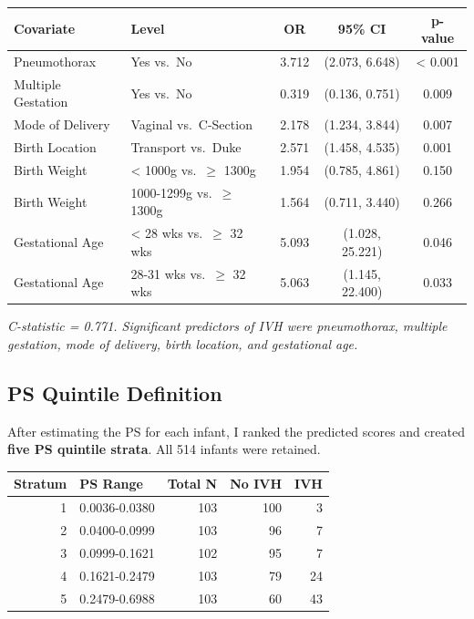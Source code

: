\documentclass[
]{article}
\begin{document}
\begin{longtable}[]{@{}llccc@{}}
\toprule
Covariate & Level & OR & 95\% CI & p-value \\
\midrule
\endhead
Pneumothorax & Yes vs.~No & 3.712 & (2.073, 6.648) & \textless{}
0.001 \\
Multiple Gestation & Yes vs.~No & 0.319 & (0.136, 0.751) & 0.009 \\
Mode of Delivery & Vaginal vs.~C-Section & 2.178 & (1.234, 3.844) &
0.007 \\
Birth Location & Transport vs.~Duke & 2.571 & (1.458, 4.535) & 0.001 \\
Birth Weight & \textless{} 1000g vs.~\(\geq\) 1300g & 1.954 & (0.785,
4.861) & 0.150 \\
Birth Weight & 1000-1299g vs.~\(\geq\) 1300g & 1.564 & (0.711, 3.440) &
0.266 \\
Gestational Age & \textless{} 28 wks vs.~\(\geq\) 32 wks & 5.093 &
(1.028, 25.221) & 0.046 \\
Gestational Age & 28-31 wks vs.~\(\geq\) 32 wks & 5.063 & (1.145,
22.400) & 0.033 \\
\bottomrule
\end{longtable}

\emph{C-statistic = 0.771. Significant predictors of IVH were
pneumothorax, multiple gestation, mode of delivery, birth location, and
gestational age.}

\hypertarget{ps-quintile-definition}{%
\subsection{PS Quintile Definition}\label{ps-quintile-definition}}

After estimating the PS for each infant, I ranked the predicted scores
and created \textbf{five PS quintile strata}. All 514 infants were
retained.

\begin{longtable}[]{@{}rlrrr@{}}
\toprule
Stratum & PS Range & Total N & No IVH & IVH \\
\midrule
\endhead
1 & 0.0036-0.0380 & 103 & 100 & 3 \\
2 & 0.0400-0.0999 & 103 & 96 & 7 \\
3 & 0.0999-0.1621 & 102 & 95 & 7 \\
4 & 0.1621-0.2479 & 103 & 79 & 24 \\
5 & 0.2479-0.6988 & 103 & 60 & 43 \\
\bottomrule
\end{longtable}
\end{document}
